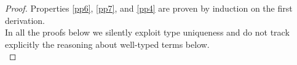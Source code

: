 \documentclass{article}
\newcommand{\csn}{\mathsf{sn}}
\newcommand{\red}{\longrightarrow}
\begin{document}
\begin{proof}
Properties \ref{pp6}, \ref{pp7}, and \ref{pp4} are proven by induction on the first derivation. 
\\[1em]
In all the proofs below we silently exploit type uniqueness and do not track explicitly the reasoning about well-typed terms below.
\\[1em]



\end{proof}
\end{document}
